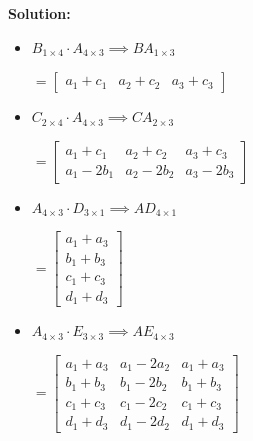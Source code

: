 \textbf{Solution:}
\begin{itemize}[label=\alph*)]
    \item $B_{1 \times 4} \cdot \! A_{4 \times 3} \implies BA_{1 \times 3}$
        \begin{answer}
            $ = \begin{bmatrix}
                a_1 + c_1 & a_2 + c_2 & a_3 + c_3
            \end{bmatrix}$
        \end{answer}
    \item $C_{2 \times 4} \cdot \! A_{4 \times 3} \implies CA_{2 \times 3}$
        \begin{answer}
            $ = \begin{bmatrix}
                a_1 + c_1  & a_2 + c_2     & a_3 + c_3 \\
                a_1 - 2b_1 & a_2 -2b_2  & a_3 -2b_3
            \end{bmatrix}$
        \end{answer}
    \item $A_{4 \times 3} \cdot \! D_{3 \times 1} \implies AD_{4 \times 1}$
        \begin{answer}
            $ = \begin{bmatrix}
                a_1 + a_3 \\
                b_1 + b_3 \\
                c_1 + c_3  \\
                d_1 + d_3
            \end{bmatrix}$
        \end{answer}
    \item $A_{4 \times 3} \cdot \! E_{3 \times 3} \implies AE_{4 \times 3}$
        \begin{answer}
            $ = \begin{bmatrix}
                a_1 + a_3  & a_1 -2a_2  & a_1 + a_3 \\
                b_1 + b_3  & b_1 -2b_2  & b_1 + b_3 \\
                c_1 + c_3   & c_1 -2c_2  & c_1 + c_3 \\
                d_1 + d_3  & d_1 -2d_2  & d_1 + d_3
            \end{bmatrix}$
        \end{answer}
\end{itemize}
